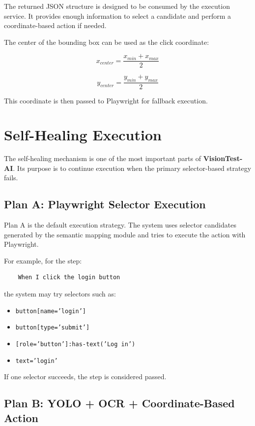 The returned JSON structure is designed to be consumed by the execution service. It provides enough information to select a candidate and perform a coordinate-based action if needed.

The center of the bounding box can be used as the click coordinate:

\[
x_{center} = \frac{x_{min} + x_{max}}{2}
\]

\[
y_{center} = \frac{y_{min} + y_{max}}{2}
\]

This coordinate is then passed to Playwright for fallback execution.

\section{Self-Healing Execution}
\label{sec:self_healing_execution}

The self-healing mechanism is one of the most important parts of \textbf{VisionTest-AI}. Its purpose is to continue execution when the primary selector-based strategy fails.

\subsection{Plan A: Playwright Selector Execution}
\label{subsec:plan_a}

Plan A is the default execution strategy. The system uses selector candidates generated by the semantic mapping module and tries to execute the action with Playwright.

For example, for the step:

\begin{verbatim}
	When I click the login button
\end{verbatim}

the system may try selectors such as:

\begin{itemize}
	\item \texttt{button[name='login']}
	\item \texttt{button[type='submit']}
	\item \texttt{[role='button']:has-text('Log in')}
	\item \texttt{text='login'}
\end{itemize}

If one selector succeeds, the step is considered passed.

\subsection{Plan B: YOLO + OCR + Coordinate-Based Action}
\label{subsec:plan_b}

